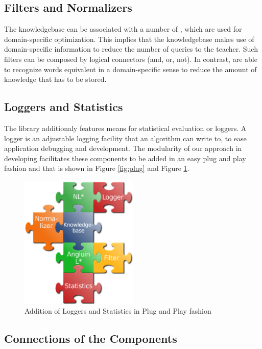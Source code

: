 \subsection{Filters and Normalizers}	
	The knowledgebase can be associated with a number of \filters, which are used for domain-specific optimization. This implies that the knowledgebase makes use of domain-specific information to reduce the number of queries to the teacher. Such filters can be composed by logical connectors (and, or, not). In contrast, \normalizers are able to recognize words equivalent in a domain-specific sense to reduce the amount of knowledge that has to be stored. 
		
\subsection{Loggers and Statistics}	
	The library additionaly features means for statistical evaluation or loggers. A logger is an adjustable logging facility that an algorithm can write to, to ease application debugging and development. The modularity of our approach in developing \libalf facilitates these components to be added in an easy plug and play fashion and that is shown in Figure \ref{fig:plug} and Figure \ref{fig:loggers}.
	
\begin{figure}[h]
	\centering
	\includegraphics[width=0.5\textwidth]{Images/combined6.png}
	\caption{Addition of Loggers and Statistics in Plug and Play fashion}
	\label{fig:loggers}
\end{figure}
	
\subsection{Connections of the Components}

